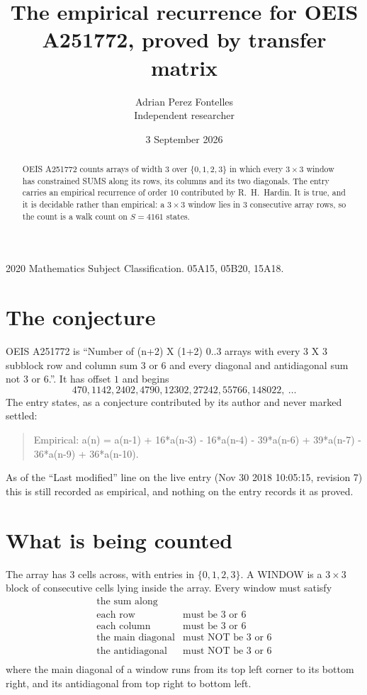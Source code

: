 \documentclass[11pt,a4paper]{article}
\title{The empirical recurrence for OEIS A251772, proved by transfer matrix}
\author{Adrian Perez Fontelles\\ \small Independent researcher}
\date{3 September 2026}
\theoremstyle{plain}
\theoremstyle{definition}
\begin{document}
\maketitle

\begin{abstract}
OEIS A251772 counts arrays of width $3$ over $\{0,1,2,3\}$ in which every $3\times3$ window has
constrained SUMS along its rows, its columns and its two diagonals. The entry carries an
empirical recurrence of order $10$ contributed by R.~H.~Hardin. It is true, and it is
decidable rather than empirical: a $3\times3$ window lies in $3$ consecutive array rows,
so the count is a walk count on $S=4161$ states.
\end{abstract}

\noindent\small 2020 Mathematics Subject Classification. 05A15, 05B20, 15A18.\normalsize

\section{The conjecture}

OEIS A251772 is ``Number of (n+2) X (1+2) 0..3 arrays with every 3 X 3 subblock row and column sum 3 or 6 and every diagonal and antidiagonal sum not 3 or 6.''. It has offset $1$ and begins
\[
470, 1142, 2402, 4790, 12302, 27242, 55766, 148022,\ \dots
\]
The entry states, as a conjecture contributed by its author and never marked settled:
\begin{quote}
Empirical: a(n) = a(n-1) + 16*a(n-3) - 16*a(n-4) - 39*a(n-6) + 39*a(n-7) - 36*a(n-9) + 36*a(n-10).
\end{quote}
As of the ``Last modified'' line on the live entry (Nov 30 2018 10:05:15, revision 7) this is still
recorded as empirical, and nothing on the entry records it as proved.

\section{What is being counted}

The array has $3$ cells across, with entries in $\{0,1,2,3\}$. A WINDOW is a $3\times3$ block
of consecutive cells lying inside the array. Every window must satisfy
\[
\begin{array}{ll}
\text{the sum along} & \text{} \\[2pt]
\text{each row} & \text{must be 3 or 6} \\
\text{each column} & \text{must be 3 or 6} \\
\text{the main diagonal} & \text{must NOT be 3 or 6} \\
\text{the antidiagonal} & \text{must NOT be 3 or 6} \\
\end{array}
\]
where the main diagonal of a window runs from its top left corner to its bottom right, and its
antidiagonal from top right to bottom left.
\end{document}
